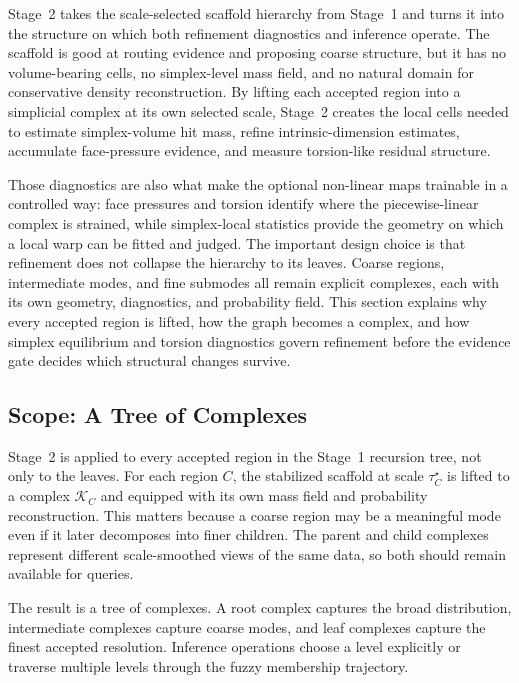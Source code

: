 \documentclass[11pt]{article}
\theoremstyle{definition}
\theoremstyle{plain}
\begin{document}
Stage~2 takes the scale-selected scaffold hierarchy from Stage~1 and turns it into the structure on which both refinement diagnostics and inference operate. The scaffold is good at routing evidence and proposing coarse structure, but it has no volume-bearing cells, no simplex-level mass field, and no natural domain for conservative density reconstruction. By lifting each accepted region into a simplicial complex at its own selected scale, Stage~2 creates the local cells needed to estimate simplex-volume hit mass, refine intrinsic-dimension estimates, accumulate face-pressure evidence, and measure torsion-like residual structure.

Those diagnostics are also what make the optional non-linear maps trainable in a controlled way: face pressures and torsion identify where the piecewise-linear complex is strained, while simplex-local statistics provide the geometry on which a local warp can be fitted and judged. The important design choice is that refinement does not collapse the hierarchy to its leaves. Coarse regions, intermediate modes, and fine submodes all remain explicit complexes, each with its own geometry, diagnostics, and probability field. This section explains why every accepted region is lifted, how the graph becomes a complex, and how simplex equilibrium and torsion diagnostics govern refinement before the evidence gate decides which structural changes survive.

\subsection{Scope: A Tree of Complexes}
Stage~2 is applied to every accepted region in the Stage~1 recursion tree, not only to the leaves. For each region $C$, the stabilized scaffold at scale $\tau_C^\star$ is lifted to a complex $\mathcal K_C$ and equipped with its own mass field and probability reconstruction. This matters because a coarse region may be a meaningful mode even if it later decomposes into finer children. The parent and child complexes represent different scale-smoothed views of the same data, so both should remain available for queries.

The result is a tree of complexes. A root complex captures the broad distribution, intermediate complexes capture coarse modes, and leaf complexes capture the finest accepted resolution. Inference operations choose a level explicitly or traverse multiple levels through the fuzzy membership trajectory.
\end{document}
